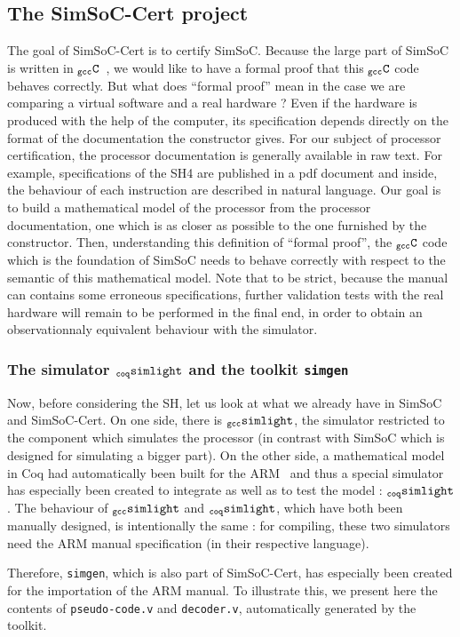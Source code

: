 \documentclass[a4paper, 11pt]{article}
\newcommand{\gccSL}{$_{\tt gcc}{\tt simlight}$\xspace}
\newcommand{\SL}{$_{\tt coq}{\tt simlight}$\xspace}
\newcommand{\simgen}{{\tt simgen}\xspace}
\newcommand{\gccC}{$_{\tt gcc}{\tt C}$\xspace}
\newcommand{\simsoc}{SimSoC\xspace}
\newcommand{\SScert}{SimSoC-Cert\xspace}
\begin{document}
\subsection{The \SScert project}
The goal of \SScert is to certify \simsoc. Because the large part of \simsoc is written in \gccC~\cite{ossc09}, we would like to have a formal proof that this \gccC code behaves correctly. But what does ``formal proof'' mean in the case we are comparing a virtual software and a real hardware ? Even if the hardware is produced with the help of the computer, its specification depends directly on the format of the documentation the constructor gives. For our subject of processor certification, the processor documentation is generally available in raw text. For example, specifications of the SH4 are published in a pdf document and inside, the behaviour of each instruction are described in natural language. Our goal is to build a mathematical model of the processor from the processor documentation, one which is as closer as possible to the one furnished by the constructor. Then, understanding this definition of ``formal proof'', the \gccC code which is the foundation of \simsoc needs to behave correctly with respect to the semantic of this mathematical model. Note that to be strict, because the manual can contains some erroneous specifications, further validation tests with the real hardware will remain to be performed in the final end, in order to obtain an observationnaly equivalent behaviour with the simulator.

\subsubsection{The simulator \SL and the toolkit \simgen}
\label{s:simgendef}
Now, before considering the SH, let us look at what we already have in \simsoc and \SScert. On one side, there is \gccSL, the simulator restricted to the component which simulates the processor (in contrast with \simsoc which is designed for simulating a bigger part). 
On the other side, a mathematical model in Coq had automatically been built for the ARM~\cite{arm} and thus a special simulator has especially been created to integrate as well as to test the model : \SL.
The behaviour of \gccSL and \SL, which have both been manually designed, is intentionally the same : for compiling, these two simulators need the ARM manual specification (in their respective language).

Therefore, \simgen, which is also part of \SScert, has especially been created for the importation of the ARM manual.
To illustrate this, we present here the contents of \verb|pseudo-code.v| and \verb|decoder.v|, automatically generated by the toolkit.
\end{document}
